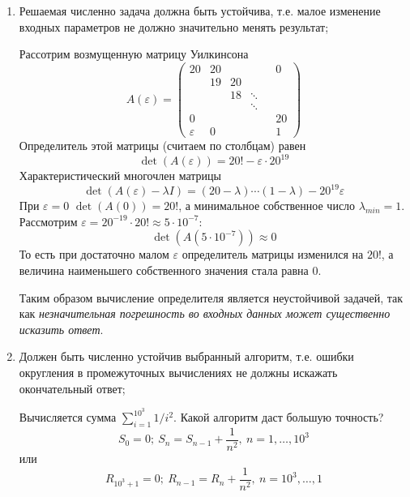 \begin{enumerate}
  \item Решаемая численно задача должна быть устойчива, т.е. малое
        изменение входных параметров не должно значительно менять результат;
        \begin{example}
          Рассотрим возмущенную матрицу Уилкинсона
          \[
            A(\varepsilon)=\left(\begin{array}{cccccc}
                20          & 20 &    &        &  & 0  \\
                            & 19 & 20 &        &  &    \\
                            &    & 18 & \ddots &  &    \\
                            &    &    & \ddots &  &    \\
                0           &    &    &        &  & 20 \\
                \varepsilon & 0  &    &        &  & 1
              \end{array}\right)
          \]
          Определитель этой матрицы (считаем по столбцам) равен
          \[\det(A(\varepsilon))=20!-\varepsilon\cdot20^{19}\]
          Характеристический многочлен матрицы
          \[\det(A(\varepsilon)-\lambda I)=(20-\lambda)\cdots(1-\lambda) - 20^{19}\varepsilon\]
          При $\varepsilon=0$ $\det(A(0))=20!$, а минимальное собственное число $\lambda_{min}=1$.
          Рассмотрим $\varepsilon=20^{-19}\cdot20!\approx5\cdot10^{-7}$:
          \[\det(A(5\cdot10^{-7}))\approx0\]
          То есть при достаточно малом $\varepsilon$ определитель
          матрицы изменился на $20!$, а величина наименьшего собственного значения стала равна $0$.

          Таким образом вычисление определителя является неустойчивой задачей,
          так как \textit{незначительная погрешность во входных данных может
            существенно исказить ответ}.
        \end{example}
  \item Должен быть численно устойчив выбранный алгоритм, т.е.
        ошибки округления в промежуточных вычислениях не должны искажать
        окончательный ответ;
        \begin{example}
          Вычисляется сумма $\sum_{i=1}^{10^3}1/i^2$. Какой алгоритм даст большую точность?
          \[S_0=0;\ S_n=S_{n-1}+\frac{1}{n^2},\ n=1,\ldots,10^3\]
          или
          \[R_{10^3+1}=0;\ R_{n-1}=R_n+\frac{1}{n^2},\ n=10^3,\ldots,1\]


\end{example}
\end{enumerate}
